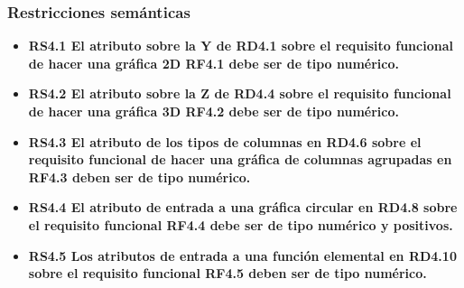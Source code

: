 \subsubsection{Restricciones semánticas}

\begin{itemize}
	\item \textbf{RS4.1 El atributo sobre la Y de RD4.1 sobre el requisito funcional de hacer una gráfica 2D RF4.1 debe ser de tipo numérico.}
	
	\item \textbf{RS4.2 El atributo sobre la Z de RD4.4 sobre el requisito funcional de hacer una gráfica 3D RF4.2 debe ser de tipo numérico.}
	
	\item \textbf{RS4.3 El atributo de los tipos de columnas en RD4.6 sobre el requisito funcional de hacer una gráfica de columnas agrupadas en RF4.3 deben ser de tipo numérico.}
	
	\item \textbf{RS4.4 El atributo de entrada a una gráfica circular en RD4.8 sobre el requisito funcional RF4.4 debe ser de tipo numérico y positivos.}
	
	\item \textbf{RS4.5 Los atributos de entrada a una función elemental en RD4.10 sobre el requisito funcional RF4.5 deben ser de tipo numérico.}
	
	
	
\end{itemize}
